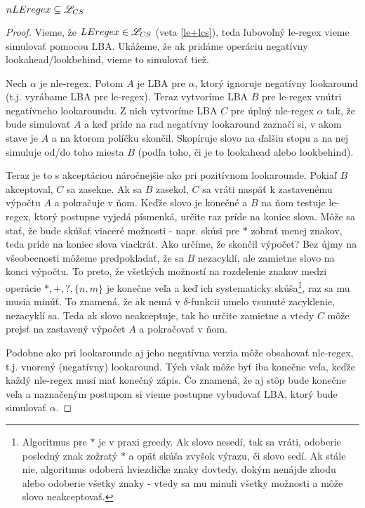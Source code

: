 \begin{veta}
$ nLEregex \subseteq \mathscr{L}_{CS} $
\end{veta}
\begin{proof}
Vieme, že $ LEregex \in \mathscr{L}_{CS} $ (veta \ref{le+lcs}), teda ľubovoľný le-regex vieme simulovať pomocou LBA. Ukážeme, že ak pridáme operáciu negatívny lookahead/lookbehind, vieme to simulovať tiež.

Nech $\alpha$ je nle-regex. Potom $A$ je LBA pre $\alpha$, ktorý ignoruje negatívny lookaround (t.j. vyrábame LBA pre le-regex). Teraz vytvoríme LBA $B$ pre le-regex vnútri negatívneho lookaroundu. Z nich vytvoríme LBA $C$ pre úplný nle-regex $\alpha$ tak, že bude simulovať $A$ a keď príde na rad negatívny lookaround zaznačí si, v akom stave je $A$ a na ktorom políčku skončil. Skopíruje slovo na ďalšiu stopu a na nej simuluje od/do toho miesta $B$ (podľa toho, či je to lookahead alebo lookbehind). 

Teraz je to s akceptáciou náročnejšie ako pri pozitívnom lookarounde. Pokiaľ $B$ akceptoval, $C$ sa zasekne. Ak sa $B$ zasekol, $C$ sa vráti naspäť k zastavenému výpočtu $A$ a pokračuje v ňom. Keďže slovo je konečné a $B$ na ňom testuje le-regex, ktorý postupne vyjedá písmenká, určite raz príde na koniec slova. Môže sa stať, že bude skúšať viaceré možnosti - napr. skúsi pre $*$ zobrať menej znakov, teda príde na koniec slova viackrát. Ako určíme, že skončil výpočet? Bez újmy na všeobecnosti môžeme predpokladať, že sa $B$ nezacyklí, ale zamietne slovo na konci výpočtu. To preto, že všetkých možností na rozdelenie znakov medzi operácie $*,+,?,\lbrace n,m\rbrace$ je konečne veľa a keď ich systematicky skúša\footnote{Algoritmus pre $*$ je v praxi greedy. Ak slovo nesedí, tak sa vráti, odoberie posledný znak zožratý $*$ a opäť skúša zvyšok výrazu, či slovo sedí. Ak stále nie, algoritmus odoberá hviezdičke znaky dovtedy, dokým nenájde zhodu alebo odoberie všetky znaky - vtedy sa mu minuli všetky možnosti a môže slovo neakceptovať.}, raz sa mu musia minúť. To znamená, že ak nemá v $\delta$-funkcii umelo vsunuté zacyklenie, nezacyklí sa. Teda ak slovo neakceptuje, tak ho určite zamietne a vtedy $C$ môže prejsť na zastavený výpočet $A$ a pokračovať v ňom.

Podobne ako pri lookarounde aj jeho negatívna verzia môže obsahovať nle-regex, t.j. vnorený (negatívny) lookaround. Tých však môže byť iba konečne veľa, keďže každý nle-regex musí mať konečný zápis. Čo znamená, že aj stôp bude konečne veľa a naznačeným postupom si vieme postupne vybudovať LBA, ktorý bude simulovať $\alpha$.
\end{proof}

